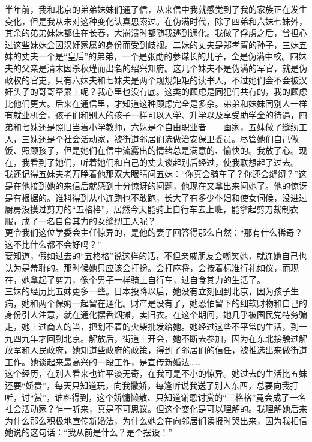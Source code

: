 半年前，我和北京的弟弟妹妹们通了信，从来信中我就感觉到了我的家族正在发生变化，但是我从未对这种变化认真思索过。在伪满时代，除了四弟和六妹七妹外，其余的弟弟妹妹都住在长春，大崩溃时都随我逃到通化。我做了俘虏之后，曾担心过这些妹妹会因汉奸家属的身份而受到歧视。二妹的丈夫是郑孝胥的孙子，三妹五妹的丈夫一个是“皇后”的弟弟，一个是张勋的参谋长的儿子，全是伪满中校。四妹夫的父亲是清末因杀秋瑾而出名的绍兴知府。这几个妹夫不是伪满的军官，就是伪政权的官吏，只有六妹夫和七妹夫是两个规规矩矩的读书人，不过她们会不会被汉奸头子的哥哥牵累上呢？我心里也没有底。这类的顾虑是同犯们共有的，我的顾虑比他们更大。后来在通信里，才知道这种顾虑完全是多余。弟弟和妹妹同别人一样有就业机会，孩子们和别人的孩子一样可以入学、升学以及享受助学金的待遇，四弟和七妹还是照旧当着小学教师，六妹是个自由职业者——画家，五妹做了缝纫工人，三妹还是个社会活动家，被街道邻居们选做治安保卫委员。尽管她们自己做饭、照顾孩子，但是她们在信中流露出的情绪总是满意的、愉快的。我放了心。现在，我看到了她们，听着她们和自己的丈夫谈起别后经过，使我联想起了过去。\\

我还记得五妹夫老万睁着他那双大眼睛问五妹：“你真会骑车了？你还会缝纫？”这是在他接到她的来信后就感到十分惊讶的问题，他现在又拿出来问她了。他的惊讶是有根据的。谁料得到从小连跑也不敢跑，长大了有多少仆妇和使女伺候，没进过厨房没摸过剪刀的“五格格”，居然今天能骑上自行车去上班，能拿起剪刀裁制衣服，成了一名自食其力的女缝纫工人呢？\\

更令我们这位学委会主任惊异的，是他的妻子回答得那么自然：“那有什么稀奇？这不比什么都不会好吗？”\\

要知道，假如过去的“五格格”说这样的话，不但亲戚朋友会嘲笑她，就连她自己也认为是羞耻的。那时候她只应该会打扮。会打麻将，会按着标准行礼如仪，而现在，她拿起了剪刀，像个男子一样骑上自行车，过自食其力的生活了。\\

三妹的经历比五妹更多一些。日本投降以后，她没有立刻回到北京，因为孩子生病，她和两个保姆一起留在通化。财产是没有了，她恐怕留下的细软财物和自己的身份引人注意，就在通化摆香烟摊，卖旧衣。在这个期间，她几乎被国民党特务骗走，她上过商人的当，把划不着的火柴批发给她。她经过这些不平常的生活，到一九四九年才回到北京。解放后，街道上开会，她不断去参加，因为在东北接触过解放军和人民政府，她知道些政府的政策，得到了邻居们的信任，被推选出来做街道工作。她谈起来最高兴的一段工作，是宣传新婚法……\\

这个经历，在别人看来也许平淡无奇，在我可是不小的惊异。她过去的生活比五妹还要“娇贵”，每天只知道玩，向我撒娇，每逢听说我送了别人东西，总要向我打听，讨“赏”，谁料得到，这个娇慵懒散、只知道谢恩讨赏的“三格格”竟会成了一名社会活动家？乍一听来，真是不可思议。但这个变化是可以理解的。我理解她后来为什么那么积极地宣传新婚法，为什么她会在向邻居们读报时哭出来，因为我相信她说的这句话：“我从前是什么？是个摆设！”\\

